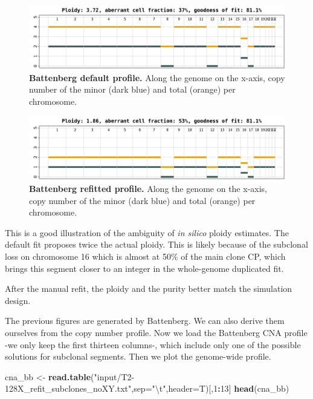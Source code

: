 \documentclass[]{article}
\newenvironment{Shaded}{\begin{snugshade}}{\end{snugshade}}
\newcommand{\CharTok}[1]{\textcolor[rgb]{0.31,0.60,0.02}{#1}}
\newcommand{\DataTypeTok}[1]{\textcolor[rgb]{0.13,0.29,0.53}{#1}}
\newcommand{\DecValTok}[1]{\textcolor[rgb]{0.00,0.00,0.81}{#1}}
\newcommand{\KeywordTok}[1]{\textcolor[rgb]{0.13,0.29,0.53}{\textbf{#1}}}
\newcommand{\NormalTok}[1]{#1}
\newcommand{\OperatorTok}[1]{\textcolor[rgb]{0.81,0.36,0.00}{\textbf{#1}}}
\newcommand{\StringTok}[1]{\textcolor[rgb]{0.31,0.60,0.02}{#1}}
\begin{document}
\begin{figure}[H]
  \centering
  \includegraphics{figures/T2-128X_BattenbergProfile_average.png}
  \caption{\textbf{Battenberg default profile.} Along the genome on the x-axis,
  copy number of the minor (dark blue) and total (orange) per chromosome.}
  \label{Figure4}
\end{figure}

\begin{figure}[H]
  \centering
  \includegraphics{figures/T2-128X_BattenbergProfile.refit_average.png}
  \caption{\textbf{Battenberg refitted profile.} Along the genome on the x-axis,
  copy number of the minor (dark blue) and total (orange) per chromosome.}
  \label{Figure5}
\end{figure}

This is a good illustration of the ambiguity of \emph{in silico} ploidy
estimates. The default fit proposes twice the actual ploidy. This is
likely because of the subclonal loss on chromosome 16 which is almost at
50\% of the main clone CP, which brings this segment closer to an
integer in the whole-genome duplicated fit.

After the manual refit, the ploidy and the purity better match the
simulation design.

The previous figures are generated by Battenberg. We can also derive
them ourselves from the copy number profile. Now we load the Battenberg
CNA profile -we only keep the first thirteen columns-, which include
only one of the possible solutions for subclonal segments. Then we plot
the genome-wide profile.

\begin{Shaded}
\begin{Highlighting}[]
\NormalTok{cna_bb <-}\StringTok{ }\KeywordTok{read.table}\NormalTok{(}\StringTok{"input/T2-128X_refit_subclones_noXY.txt"}\NormalTok{,}\DataTypeTok{sep=}\StringTok{"}\CharTok{\textbackslash{}t}\StringTok{"}\NormalTok{,}\DataTypeTok{header=}\NormalTok{T)[,}\DecValTok{1}\OperatorTok{:}\DecValTok{13}\NormalTok{]}
\KeywordTok{head}\NormalTok{(cna_bb)}
\end{Highlighting}
\end{Shaded}
\end{document}
